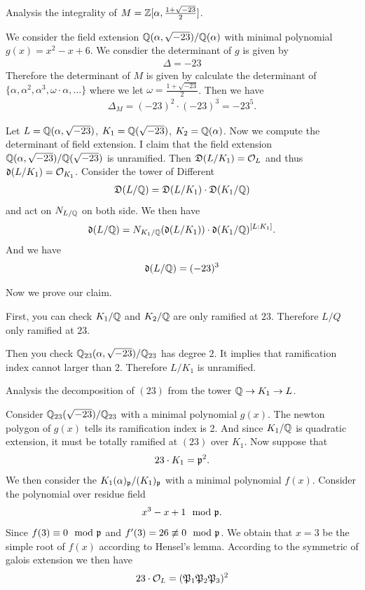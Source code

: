 {\prob Analysis the integrality of $M=\mathbb{Z}[\alpha,\frac{1+\sqrt{-23}}{2}]$.

We consider the field extension $\mathbb{Q}(\alpha,\sqrt{-23})/\mathbb{Q}(\alpha)$ with minimal polynomial $g(x)=x^2-x+6$.
We consdier the determinant of $g$ is given by 
\begin{align*}
    \Delta = -23
\end{align*}
Therefore the determinant of $M$ is given by calculate the determinant of $\{\alpha,\alpha^2,\alpha^3,\omega\cdot \alpha,\dots\}$
where we let $\omega = \frac{1+\sqrt{-23}}{2}$. Then we have 
\begin{align*}
    \Delta_{M} = (-23)^{2} \cdot (-23)^{3} = -23^5.
\end{align*}

Let $L=\mathbb{Q}(\alpha,\sqrt{-23})$, $K_1=\mathbb{Q}(\sqrt{-23})$, $K_2=\mathbb{Q}(\alpha)$.
Now we compute the determinant of field extension. I claim that the field extension $\mathbb{Q}(\alpha,\sqrt{-23})/\mathbb{Q}(\sqrt{-23})$
is unramified. Then $\mathfrak{D}(L/K_1)=\mathcal{O}_L$ and thus $\mathfrak{d}(L/K_1)=\mathcal{O}_{K_1}$. Consider the tower of Different 
\begin{align*}
    \mathfrak{D}(L/\mathbb{Q}) = \mathfrak{D}(L/K_1)\cdot \mathfrak{D}(K_1/\mathbb{Q})
\end{align*}
and act on $N_{L/\mathbb{Q}}$ on both side.
We then have 
\begin{align*}
    \mathfrak{d}(L/\mathbb{Q})=N_{K_1/\mathbb{Q}}(\mathfrak{d}(L/K_1))\cdot \mathfrak{d}(K_1/\mathbb{Q})^{[L:K_1]}.
\end{align*}
And we have 
\begin{align*}
    \mathfrak{d}(L/\mathbb{Q})= (-23)^3
\end{align*}

Now we prove our claim.  

First, you can check $K_1/\mathbb{Q}$ and $K_2/\mathbb{Q}$ are only ramified at $23$. Therefore $L/Q$ only ramified at $23$.




Then you check $\mathbb{Q}_{23}(\alpha,\sqrt{-23})/\mathbb{Q}_{23}$ has degree $2$. It implies that ramification index cannot larger than 2.
Therefore $L/K_1$ is unramified.

\prob Analysis the decomposition of $(23)$ from the tower $\mathbb{Q}\to K_1\to L$.

Consider $\mathbb{Q}_{23}(\sqrt{-23})/\mathbb{Q}_{23}$ with a minimal polynomial $g(x)$. The newton polygon of $g(x)$ tells its ramification index is 2.
And since $K_1/\mathbb{Q}$ is quadratic extension, it must be totally ramified at $(23)$ over $K_1$. Now suppose that 
\begin{align*}
    23\cdot K_1 = \mathfrak{p}^2.
\end{align*}
We then consider the $K_1(\alpha)_{\mathfrak{p}}/(K_1)_{\mathfrak{p}}$ with a minimal polynomial $f(x)$. 
Consider the polynomial over residue field 
\begin{align*}
    x^3-x+1 \mod {\mathfrak{p}}.
\end{align*}
Since $f(3)\equiv 0\mod {\mathfrak{p}}$ and $f'(3) = 26\not\equiv 0\mod{\mathfrak{p}} $. We obtain that $x=3$ be the simple root of $f(x)$ according to Hensel's lemma.
According to the symmetric of galois extension we then have 
\begin{align*}
    23\cdot \mathcal{O}_L = (\mathfrak{P}_1\mathfrak{P}_2\mathfrak{P}_3)^2
\end{align*}

}
